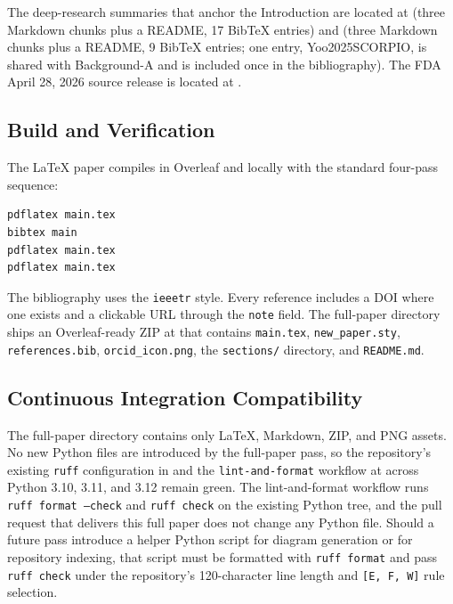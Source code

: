 The deep-research summaries that anchor the Introduction are located
at  (three Markdown
chunks plus a README, 17 BibTeX entries) and
 (three Markdown
chunks plus a README, 9 BibTeX entries; one entry, Yoo2025SCORPIO, is
shared with Background-A and is included once in the bibliography).
The FDA April 28, 2026 source release is located at
\cite{fda2026realtime}.

\subsection{Build and Verification}
\label{sec:methods-build}

The LaTeX paper compiles in Overleaf and locally with the standard
four-pass sequence:
\begin{verbatim}
pdflatex main.tex
bibtex main
pdflatex main.tex
pdflatex main.tex
\end{verbatim}

The bibliography uses the \texttt{ieeetr} style. Every reference
includes a DOI where one exists and a clickable URL through the
\texttt{note} field. The full-paper directory ships an Overleaf-ready
ZIP at
that contains \texttt{main.tex}, \texttt{new\_paper.sty},
\texttt{references.bib}, \texttt{orcid\_icon.png}, the
\texttt{sections/} directory, and \texttt{README.md}.

\subsection{Continuous Integration Compatibility}
\label{sec:methods-ci}

The full-paper directory contains only LaTeX, Markdown, ZIP, and PNG
assets. No new Python files are introduced by the full-paper pass, so
the repository's existing \texttt{ruff} configuration in
 and the \texttt{lint-and-format} workflow at
 across Python 3.10, 3.11, and 3.12
remain green. The lint-and-format workflow runs \texttt{ruff format
--check} and \texttt{ruff check} on the existing Python tree, and the
pull request that delivers this full paper does not change any Python
file. Should a future pass introduce a helper Python script for
diagram generation or for repository indexing, that script must be
formatted with \texttt{ruff format} and pass \texttt{ruff check} under
the repository's 120-character line length and \texttt{[E, F, W]} rule
selection.


